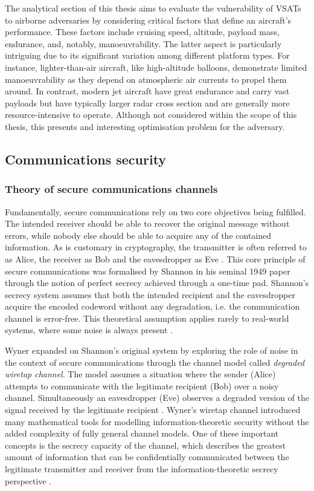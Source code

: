 \documentclass[english, 12pt, a4paper, elec, utf8, a-1b, online]{aaltothesis}
\begin{document}
The analytical section of this thesis aims to evaluate the vulnerability of VSATs to airborne adversaries by considering critical factors that define an aircraft's performance.
These factors include cruising speed, altitude, payload mass, endurance, and, notably, manoeuvrability. The latter aspect is particularly intriguing due to its significant variation among different platform types.
For instance, lighter-than-air aircraft, like high-altitude balloons, demonstrate limited manoeuvrability as they depend on atmospheric air currents to propel them around.
In contrast, modern jet aircraft have great endurance and carry vast payloads but have typically larger radar cross section and are generally more resource-intensive to operate.
Although not considered within the scope of this thesis, this presents and interesting optimisation problem for the adversary.

\subsection{Communications security}
\subsubsection{Theory of secure communications channels}
Fundamentally, secure communications rely on two core objectives being fulfilled.
The intended receiver should be able to recover the original message without errors, while nobody else should be able to acquire any of the contained information.
As is customary in cryptography, the transmitter is often referred to as Alice, the receiver as Bob and the eavesdropper as Eve \cite{bloch2011physical}.
This core principle of secure communications was formalised by Shannon \cite{shannon1949communication} in his seminal 1949 paper through the notion of perfect secrecy achieved through a one-time pad.
Shannon's secrecy system assumes that both the intended recipient and the eavesdropper acquire the encoded codeword without any degradation, i.e. the communication channel is error-free.
This theoretical assumption applies rarely to real-world systems, where some noise is always present \cite{bloch2011physical}.

Wyner \cite{wyner1975thewiretap} expanded on Shannon's original system by exploring the role of noise in the context of secure communications through the channel model called \textit{degraded wiretap channel}.
The model assumes a situation where the sender (Alice) attempts to communicate with the legitimate recipient (Bob) over a noisy channel.
Simultaneously an eavesdropper (Eve) observes a degraded version of the signal received by the legitimate recipient \cite{barros2006secrecy}.
Wyner's wiretap channel introduced many mathematical tools for modelling information-theoretic security without the added complexity of fully general channel models.
One of these important concepts is the secrecy capacity of the channel, which describes the greatest amount of information that can be confidentially communicated between the legitimate transmitter and receiver from the information-theoretic secrecy perspective \cite{bloch2011physical}.
\end{document}
